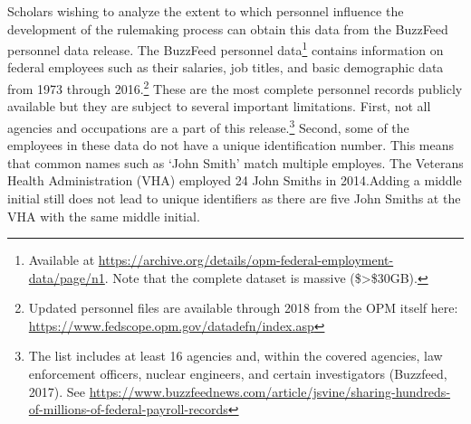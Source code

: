 \documentclass[12pt,notitlepage]{article}
\newcounter{cor}
\newcounter{def}
\begin{document}
Scholars wishing to analyze the extent to which personnel influence the
development of the rulemaking process can obtain this data from the
BuzzFeed personnel data release. The BuzzFeed personnel data\footnote{Available
  at
  \url{https://archive.org/details/opm-federal-employment-data/page/n1}.
  Note that the complete dataset is massive (\$\textgreater\$30GB).}
contains information on federal employees such as their salaries, job
titles, and basic demographic data from 1973 through 2016.\footnote{Updated
  personnel files are available through 2018 from the OPM itself here:
  \url{https://www.fedscope.opm.gov/datadefn/index.asp}} These are the
most complete personnel records publicly available but they are subject
to several important limitations. First, not all agencies and
occupations are a part of this release.\footnote{The list includes at
  least 16 agencies and, within the covered agencies, law enforcement
  officers, nuclear engineers, and certain investigators (Buzzfeed,
  2017). See
  \url{https://www.buzzfeednews.com/article/jsvine/sharing-hundreds-of-millions-of-federal-payroll-records}}
Second, some of the employees in these data do not have a unique
identification number. This means that common names such as `John Smith'
match multiple employes. The Veterans Health Administration (VHA)
employed 24 John Smiths in 2014.Adding a middle initial still does not
lead to unique identifiers as there are five John Smiths at the VHA with
the same middle initial.
\end{document}
